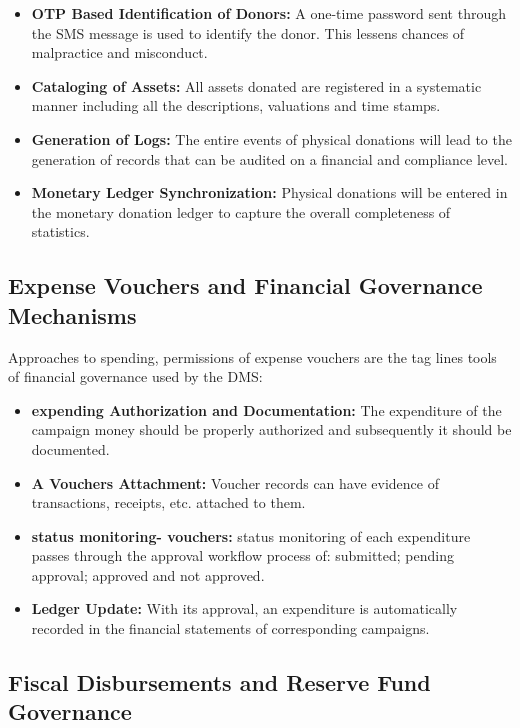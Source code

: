 \documentclass{thesis-library}
\begin{document}
\begin{itemize}
    \item \textbf{OTP Based Identification of Donors:} A one-time password sent through the SMS message is used to identify the donor. This lessens chances of malpractice and misconduct.
    \item \textbf{Cataloging of Assets:} All assets donated are registered in a systematic manner including all the descriptions, valuations and time stamps.
    \item \textbf{Generation of Logs:} The entire events of physical donations will lead to the generation of records that can be audited on a financial and compliance level.
    \item \textbf{Monetary Ledger Synchronization:} Physical donations will be entered in the monetary donation ledger to capture the overall completeness of statistics.
\end{itemize}

\subsection{Expense Vouchers and Financial Governance Mechanisms}

Approaches to spending, permissions of expense vouchers are the tag lines tools of financial governance used by the DMS:

\begin{itemize}
    \item \textbf{expending Authorization and Documentation:} The expenditure of the campaign money should be properly authorized and subsequently it should be documented.
    \item \textbf{A Vouchers Attachment:} Voucher records can have evidence of transactions, receipts, etc. attached to them.
    \item \textbf{status monitoring- vouchers:} status monitoring of each expenditure passes through the approval workflow process of: submitted; pending approval; approved and not approved.
    \item \textbf{Ledger Update:} With its approval, an expenditure is automatically recorded in the financial statements of corresponding campaigns.
\end{itemize}

\subsection{Fiscal Disbursements and Reserve Fund Governance}
\end{document}
